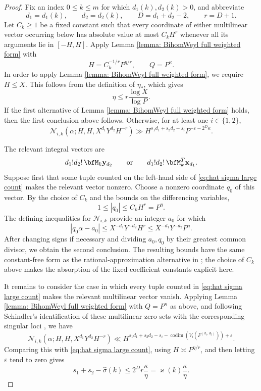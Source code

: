 \documentclass[12pt,reqno]{amsart}
\theoremstyle{definition}
\theoremstyle{remark}
\numberwithin{equation}{section}
\newcommand{\codim}[1]{\operatorname{codim}\left(#1\right)}
\def\bfx{{\mathbf x}}
\def\bfy{{\mathbf y}}
\def\a{{\alpha}} \def\bfalp{{\boldsymbol \alpha}} \def\atil{{\widetilde \alpha}}
\def\eps{\varepsilon}
\begin{document}
\begin{proof}
    Fix an index $0\leq k\leq m$ for which
    $d_1(k),d_2(k)>0$, and abbreviate
    \[
        d_1=d_1(k),
        \qquad
        d_2=d_2(k),
        \qquad
        D=d_1+d_2-2,
        \qquad
        r=D+1.
    \]
    Let $C_k\geq 1$ be a fixed constant such that every coordinate of
    either multilinear vector occurring below has absolute value at most
    $C_kH^r$ whenever all its arguments lie in $[-H,H]$. Apply Lemma
    \ref{lemma: BihomWeyl full weighted form} with
    \[
        H=C_k^{-1/r}P^{\eta/r},
        \qquad
        Q=P^\kappa.
    \]
    In order to apply Lemma
    \ref{lemma: BihomWeyl full weighted form}, we require $H\leq X$.
    This follows from the definition of $\eta_*$, which gives
    \[
        \eta\leq r\frac{\log X}{\log P}.
    \]
    If the first
    alternative of Lemma \ref{lemma: BihomWeyl full weighted form} holds,
    then the first conclusion above follows. Otherwise, for at least one
    $i\in\{1,2\}$,
    \begin{equation}\label{eq:hat sigma large count}
        \mathcal N_{i,k}
        \left(\a;H,H,X^{d_1}Y^{d_2}H^{-r}\right)
        \gg
        H^{s_1d_1+s_2d_2-s_i}
        P^{-\eps-2^D\kappa}.
    \end{equation}

    The relevant integral vectors are
    \[
        d_1!d_2!\,\bfM_k\bfy_{d_2}
        \qquad\text{or}\qquad
        d_1!d_2!\,\bfM_k^T\bfx_{d_1}.
    \]
    Suppose first that some tuple counted on the left-hand side of
    \eqref{eq:hat sigma large count} makes the relevant vector nonzero.
    Choose a nonzero coordinate $q_0$ of this vector. By
    the choice of $C_k$ and the bounds on the differencing variables,
    \[
        1\leq |q_0|\leq C_kH^r=P^\eta.
    \]
    The defining inequalities for $\mathcal N_{i,k}$ provide an integer
    $a_0$ for which
    \[
        |q_0\a-a_0|
        \leq
        X^{-d_1}Y^{-d_2}H^r
        \leq X^{-d_1}Y^{-d_2}P^\eta.
    \]
    After changing signs if necessary and dividing $a_0,q_0$ by their
    greatest common divisor, we obtain the second conclusion. The resulting
    bounds have the same constant-free form as the rational-approximation
    alternative in \cite[Lemma 2.5]{Birch1962}; the choice of $C_k$ above
    makes the absorption of the fixed coefficient constants explicit here.

    It remains to consider the case in which every tuple counted in
    \eqref{eq:hat sigma large count} makes the relevant multilinear
    vector vanish. Applying Lemma
    \ref{lemma: BihomWeyl full weighted form} with $Q=P^\kappa$ as above,
    and following Schindler's identification of these multilinear zero
    sets with the corresponding singular loci
    \cite[Lemmas 4.2 and 4.3]{Schindler2014}, we have
    \[
        \mathcal N_{i,k}
        \left(\a;H,H,X^{d_1}Y^{d_2}H^{-r}\right)
        \ll
        H^{s_1d_1+s_2d_2-s_i-\codim{V_i(F^{(d_1,d_2)})}+\eps}.
    \]
    Comparing this with \eqref{eq:hat sigma large count}, using
    $H\asymp P^{\eta/r}$, and then letting $\eps$ tend to zero gives
    \[
        s_1+s_2-\widehat{\sigma}(k)
        \leq
        2^D r\frac{\kappa}{\eta}
        =\varkappa(k)\frac{\kappa}{\eta}.
    \]


\end{proof}
\end{document}

